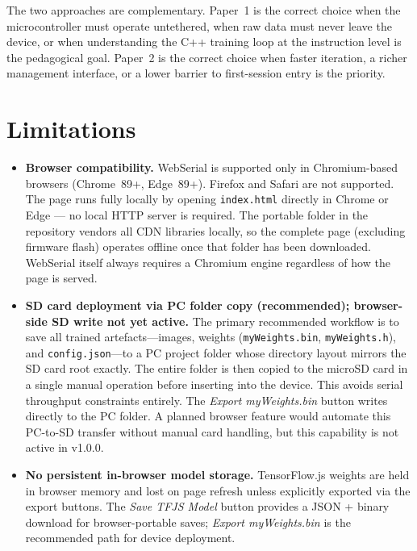 \documentclass[11pt]{article}
\begin{document}
The two approaches are complementary. Paper~1 is the correct choice when the
microcontroller must operate untethered, when raw data must never leave the device, or
when understanding the C++ training loop at the instruction level is the pedagogical
goal. Paper~2 is the correct choice when faster iteration, a richer management
interface, or a lower barrier to first-session entry is the priority.

\section{Limitations}

\begin{itemize}
  \item \textbf{Browser compatibility.} WebSerial is supported only in Chromium-based
        browsers (Chrome~89+, Edge~89+). Firefox and Safari are not supported.
        The page runs fully locally by opening \texttt{index.html} directly in
        Chrome or Edge --- no local HTTP server is required. The portable folder
        in the repository vendors all CDN libraries locally, so the complete
        page (excluding firmware flash) operates offline once that folder has been
        downloaded. WebSerial itself always requires a Chromium engine regardless
        of how the page is served.

  \item \textbf{SD card deployment via PC folder copy (recommended); browser-side SD write not yet active.}
        The primary recommended workflow is to save all trained artefacts---images, weights
        (\texttt{myWeights.bin}, \texttt{myWeights.h}), and \texttt{config.json}---to
        a PC project folder whose directory layout mirrors the SD card root exactly.
        The entire folder is then copied to the microSD card in a single manual operation
        before inserting into the device. This avoids serial throughput constraints
        entirely. The \textit{Export myWeights.bin} button writes directly to the
        PC folder. A planned browser feature would automate this PC-to-SD transfer
        without manual card handling, but this capability is not active in v1.0.0.

  \item \textbf{No persistent in-browser model storage.} TensorFlow.js weights are
        held in browser memory and lost on page refresh unless explicitly exported via
        the export buttons. The \textit{Save TFJS Model} button provides a JSON +
        binary download for browser-portable saves; \textit{Export myWeights.bin} is
        the recommended path for device deployment.


\end{itemize}
\end{document}
